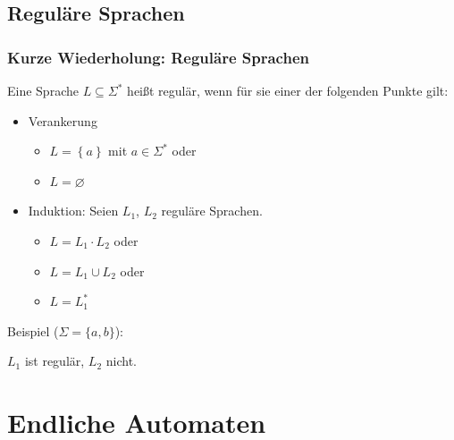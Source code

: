 \subsection{Reguläre Sprachen}
\begin{frame}
 \frametitle{Kurze Wiederholung: Reguläre Sprachen}

        Eine Sprache \(L\subseteq\Sigma^*\) heißt regulär, wenn für sie einer der folgenden Punkte gilt:

\begin{itemize}
\item Verankerung
      \begin{itemize}
      \item $L = \left\lbrace a \right\rbrace$ mit $a\in\Sigma^*$ oder
      \item $L = \varnothing$
      \end{itemize}
\item Induktion: Seien \(L_1\), \(L_2\) reguläre Sprachen.
      \begin{itemize}
      \item \(L = L_1 \cdot L_2\) oder
      \item \(L = L_1 \cup L_2\) oder
      \item \(L = L_1^*\)
      \end{itemize}
\end{itemize}

Beispiel ($\Sigma = \{a,b\}$):

	
	$L_1$ ist regulär, $L_2$ nicht.
\end{frame}

\section{Endliche Automaten}
